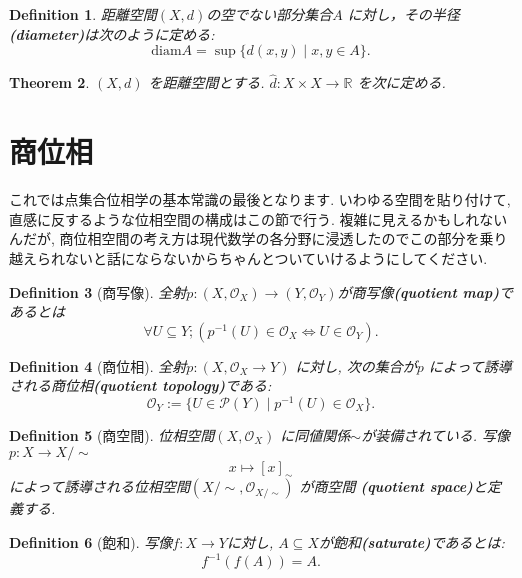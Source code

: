\documentclass[lualatex]{ltjsbook}
\newtheorem{theorem}{Theorem}[section]
\newtheorem{definition}[theorem]{Definition}
\theoremstyle{remark}
\theoremstyle{plain}
\begin{document}
\begin{definition}
	距離空間$\left( X ,d \right) $の空でない部分集合$A$ に対し，その半径\textbf{(diameter)}は次のように定める:
	\[
		\mathrm{diam}A= \sup \{d(x,y)  \mid x,y \in A\} 
	.\] 
\end{definition}

\begin{theorem}
	$\left( X,d \right) $ を距離空間とする. $ \hat{d}: X \times X \to \mathbb{R} $ を次に定める.
\end{theorem}
\section{商位相}

これでは点集合位相学の基本常識の最後となります.
いわゆる空間を貼り付けて, 直感に反するような位相空間の構成はこの節で行う.
複雑に見えるかもしれないんだが, 商位相空間の考え方は現代数学の各分野に浸透したのでこの部分を乗り越えられないと話にならないからちゃんとついていけるようにしてください. 

\begin{definition}[商写像]
	全射$p: \left( X, \mathcal{O}_X \right) \to \left( Y, \mathcal{O}_Y \right)  $が商写像\textbf{(quotient map)}であるとは
	\[
	\forall U \subseteq Y;\left( p^{-1}\left( U \right) \in \mathcal{O}_X \iff U \in \mathcal{O}_Y \right) 
	.\] 
\end{definition}

\begin{definition}[商位相]
	全射$p:\left( X,\mathcal{O}_X \to Y \right) $ に対し, 次の集合が$p$ によって誘導される商位相\textbf{(quotient topology)}である:
	\[
	\mathcal{O}_Y := \{U \in \mathcal{P}\left( Y \right)  \mid p^{-1}\left( U \right)  \in \mathcal{O}_X \} 
	.\] 
	
\end{definition}

\begin{definition}[商空間]
	位相空間$\left( X, \mathcal{O}_X \right) $ に同値関係$\sim$が装備されている. 
	 写像$p: X \to X / \sim $
      $$
	x \mapsto [x]_{\sim}
      $$
      によって誘導される位相空間$\left( X / \sim , \mathcal{O}_{X / \sim} \right) $ が商空間 \textbf{(quotient space)}と定義する.
\end{definition}

\begin{definition}[飽和]
	写像$f:X \to Y$に対し, $A \subseteq X$が飽和\textbf{(saturate)}であるとは:
	\[
	f^{-1}\left(f( A) \right) = A
	.\] 
\end{definition}
\end{document}
